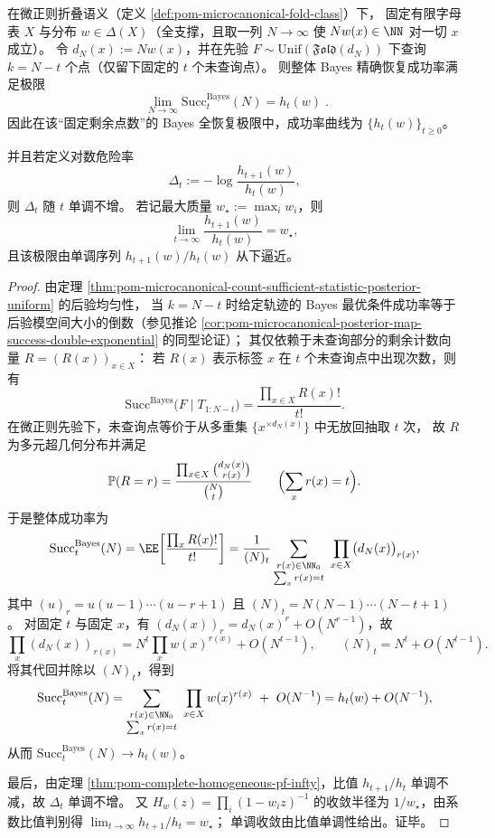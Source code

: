 \begin{corollary}\label{cor:pom-bayes-full-recovery-hazard-monotone}
在微正则折叠语义（定义 \ref{def:pom-microcanonical-fold-class}）下，
固定有限字母表 \(X\) 与分布 \(w\in\Delta(X)\)（全支撑，且取一列 \(N\to\infty\) 使 \(Nw(x)\in\NN\) 对一切 \(x\) 成立）。
令 \(d_N(x):=Nw(x)\)，并在先验 \(F\sim\mathrm{Unif}(\mathfrak{Fold}(d_N))\) 下查询 \(k=N-t\) 个点（仅留下固定的 \(t\) 个未查询点）。
则整体 Bayes 精确恢复成功率满足极限
\[
\boxed{\;
\lim_{N\to\infty}\mathrm{Succ}^{\mathrm{Bayes}}_t(N)=h_t(w)\; }.
\]
因此在该“固定剩余点数”的 Bayes 全恢复极限中，成功率曲线为 \(\{h_t(w)\}_{t\ge0}\)。
\par
{}
并且若定义对数危险率
\[
\Delta_t:=-\log\frac{h_{t+1}(w)}{h_t(w)},
\]
则 \(\Delta_t\) 随 \(t\) 单调不增。
若记最大质量 \(w_\star:=\max_i w_i\)，则
\[
\lim_{t\to\infty}\frac{h_{t+1}(w)}{h_t(w)}=w_\star,
\]
且该极限由单调序列 \(h_{t+1}(w)/h_t(w)\) 从下逼近。
\end{corollary}
\begin{proof}
由定理 \ref{thm:pom-microcanonical-count-sufficient-statistic-posterior-uniform} 的后验均匀性，
当 \(k=N-t\) 时给定轨迹的 Bayes 最优条件成功率等于后验模空间大小的倒数（参见推论 \ref{cor:pom-microcanonical-posterior-map-success-double-exponential} 的同型论证）；
其仅依赖于未查询部分的剩余计数向量 \(R=(R(x))_{x\in X}\)：
若 \(R(x)\) 表示标签 \(x\) 在 \(t\) 个未查询点中出现次数，则有
\[
\mathrm{Succ}^{\mathrm{Bayes}}\bigl(F\mid T_{1:N-t}\bigr)=\frac{\prod_{x\in X}R(x)!}{t!}.
\]
在微正则先验下，未查询点等价于从多重集 \(\{x^{\times d_N(x)}\}\) 中无放回抽取 \(t\) 次，
故 \(R\) 为多元超几何分布并满足
\[
\mathbb{P}(R=r)=\frac{\prod_{x\in X}\binom{d_N(x)}{r(x)}}{\binom{N}{t}}
\qquad\Bigl(\sum_x r(x)=t\Bigr).
\]
于是整体成功率为
\[
\mathrm{Succ}^{\mathrm{Bayes}}_t(N)
=\EE\!\left[\frac{\prod_x R(x)!}{t!}\right]
=\frac{1}{(N)_t}\sum_{\substack{r(x)\in\NN_0\\ \sum_x r(x)=t}}\ \prod_{x\in X}\bigl(d_N(x)\bigr)_{r(x)},
\]
其中 \((u)_r=u(u-1)\cdots(u-r+1)\) 且 \((N)_t=N(N-1)\cdots(N-t+1)\)。
对固定 \(t\) 与固定 \(x\)，有 \((d_N(x))_{r}=d_N(x)^{r}+O(N^{r-1})\)，故
\[
\prod_x (d_N(x))_{r(x)}
=N^{t}\prod_x w(x)^{r(x)}+O(N^{t-1}),
\qquad
(N)_t=N^{t}+O(N^{t-1}).
\]
将其代回并除以 \((N)_t\)，得到
\[
\mathrm{Succ}^{\mathrm{Bayes}}_t(N)
=\sum_{\substack{r(x)\in\NN_0\\ \sum_x r(x)=t}}\ \prod_{x\in X} w(x)^{r(x)}\ +\ O(N^{-1})
=h_t(w)+O(N^{-1}),
\]
从而 \(\mathrm{Succ}^{\mathrm{Bayes}}_t(N)\to h_t(w)\)。
\par
最后，由定理 \ref{thm:pom-complete-homogeneous-pf-infty}，比值 \(h_{t+1}/h_t\) 单调不减，故 \(\Delta_t\) 单调不增。
又 \(H_w(z)=\prod_i(1-w_i z)^{-1}\) 的收敛半径为 \(1/w_\star\)，由系数比值判别得 \(\lim_{t\to\infty}h_{t+1}/h_t=w_\star\)；
单调收敛由比值单调性给出。证毕。
\end{proof}

